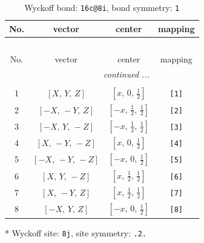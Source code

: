 \documentclass[fleqn,8pt]{jsarticle}
\begin{document}
\renewcommand{\arraystretch}{1.2}
\begin{longtable}{cccc}
\caption{Wyckoff bond: {\tt 16c@8i}, bond symmetry: {\tt 1}}
 \\
 \hline \hline
No. & vector & center & mapping \\ \hline \endfirsthead

\multicolumn{3}{l}{\tablename\ \thetable{}} \\
 \hline \hline
No. & vector & center & mapping \\ \hline \endhead

 \hline \hline
\multicolumn{3}{r}{\footnotesize\it continued ...} \\ \endfoot

 \hline \hline
\multicolumn{3}{r}{} \\ \endlastfoot

1 & $\left[ X,\, Y,\, Z \right]$ & $\left[ x,\, 0,\, \frac{1}{2} \right]$ & {\tt [1]} \\ \hline
2 & $\left[ - X,\, - Y,\, Z \right]$ & $\left[ - x,\, \frac{1}{2},\, \frac{1}{2} \right]$ & {\tt [2]} \\ \hline
3 & $\left[ - X,\, Y,\, - Z \right]$ & $\left[ - x,\, \frac{1}{2},\, \frac{1}{2} \right]$ & {\tt [3]} \\ \hline
4 & $\left[ X,\, - Y,\, - Z \right]$ & $\left[ x,\, 0,\, \frac{1}{2} \right]$ & {\tt [4]} \\ \hline
5 & $\left[ - X,\, - Y,\, - Z \right]$ & $\left[ - x,\, 0,\, \frac{1}{2} \right]$ & {\tt [5]} \\ \hline
6 & $\left[ X,\, Y,\, - Z \right]$ & $\left[ x,\, \frac{1}{2},\, \frac{1}{2} \right]$ & {\tt [6]} \\ \hline
7 & $\left[ X,\, - Y,\, Z \right]$ & $\left[ x,\, \frac{1}{2},\, \frac{1}{2} \right]$ & {\tt [7]} \\ \hline
8 & $\left[ - X,\, Y,\, Z \right]$ & $\left[ - x,\, 0,\, \frac{1}{2} \right]$ & {\tt [8]} \\
\end{longtable}
* Wyckoff site: {\tt 8j}, site symmetry: {\tt .2.}
\renewcommand{\arraystretch}{1.2}
\end{document}
